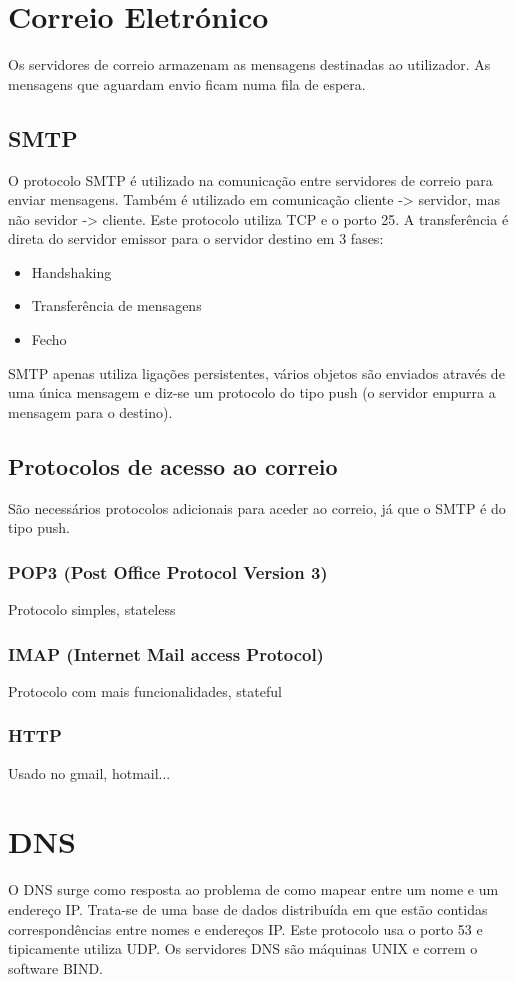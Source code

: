 \documentclass[10pt,a4paper]{report}
\begin{document}
\section{Correio Eletrónico}
Os servidores de correio armazenam as mensagens destinadas ao utilizador. As mensagens que aguardam envio ficam numa fila de espera.
\subsection{SMTP}
O protocolo SMTP é utilizado na comunicação entre servidores de correio para enviar mensagens. Também é utilizado em comunicação cliente -> servidor, mas não sevidor -> cliente.
Este protocolo utiliza TCP e o porto 25. A transferência é direta do servidor emissor para o servidor destino em 3 fases:
\begin{itemize}
\item Handshaking
\item Transferência de mensagens
\item Fecho
\end{itemize}
SMTP apenas utiliza ligações persistentes, vários objetos são enviados através de uma única mensagem e diz-se um protocolo do tipo push (o servidor empurra a mensagem para o destino).
\subsection{Protocolos de acesso ao correio}
São necessários protocolos adicionais para aceder ao correio, já que o SMTP é do tipo push.
\subsubsection{POP3 (Post Office Protocol Version 3)}
Protocolo simples, stateless
\subsubsection{IMAP (Internet Mail access Protocol)}
Protocolo com mais funcionalidades, stateful
\subsubsection{HTTP}
Usado no gmail, hotmail...
\section{DNS}
O DNS surge como resposta ao problema de como mapear entre um nome e um endereço IP. Trata-se de uma base de dados distribuída em que estão contidas correspondências entre nomes e endereços IP. Este protocolo usa o porto 53 e tipicamente utiliza UDP. Os servidores DNS são máquinas UNIX e correm o software BIND.
\end{document}
